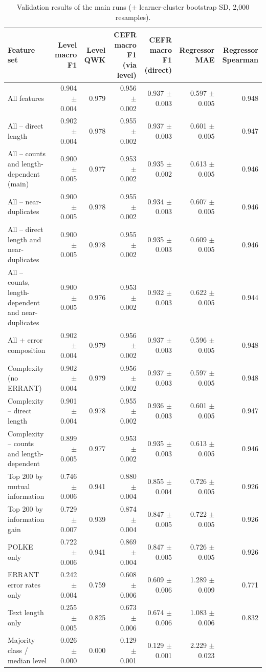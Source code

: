 \begin{table}[t]
\centering
\small
\begin{tabular}{lrrrrrr}
\toprule
Feature set & Level macro F1 & Level QWK & CEFR macro F1 (via level) & CEFR macro F1 (direct) & Regressor MAE & Regressor Spearman \\
\midrule
All features & 0.904 $\pm$ 0.004 & 0.979 & 0.956 $\pm$ 0.002 & 0.937 $\pm$ 0.003 & 0.597 $\pm$ 0.005 & 0.948 \\
All -- direct length & 0.902 $\pm$ 0.004 & 0.978 & 0.955 $\pm$ 0.002 & 0.937 $\pm$ 0.003 & 0.601 $\pm$ 0.005 & 0.947 \\
All -- counts and length-dependent (main) & 0.900 $\pm$ 0.005 & 0.977 & 0.953 $\pm$ 0.002 & 0.935 $\pm$ 0.002 & 0.613 $\pm$ 0.005 & 0.946 \\
All -- near-duplicates & 0.900 $\pm$ 0.005 & 0.978 & 0.955 $\pm$ 0.002 & 0.934 $\pm$ 0.003 & 0.607 $\pm$ 0.005 & 0.946 \\
All -- direct length and near-duplicates & 0.900 $\pm$ 0.005 & 0.978 & 0.955 $\pm$ 0.002 & 0.935 $\pm$ 0.003 & 0.609 $\pm$ 0.005 & 0.946 \\
All -- counts, length-dependent and near-duplicates & 0.900 $\pm$ 0.005 & 0.976 & 0.953 $\pm$ 0.002 & 0.932 $\pm$ 0.003 & 0.622 $\pm$ 0.005 & 0.944 \\
All + error composition & 0.902 $\pm$ 0.004 & 0.979 & 0.956 $\pm$ 0.002 & 0.937 $\pm$ 0.003 & 0.596 $\pm$ 0.005 & 0.948 \\
Complexity (no ERRANT) & 0.902 $\pm$ 0.004 & 0.979 & 0.956 $\pm$ 0.002 & 0.937 $\pm$ 0.003 & 0.597 $\pm$ 0.005 & 0.948 \\
Complexity -- direct length & 0.901 $\pm$ 0.004 & 0.978 & 0.955 $\pm$ 0.002 & 0.936 $\pm$ 0.003 & 0.601 $\pm$ 0.005 & 0.947 \\
Complexity -- counts and length-dependent & 0.899 $\pm$ 0.005 & 0.977 & 0.953 $\pm$ 0.002 & 0.935 $\pm$ 0.003 & 0.613 $\pm$ 0.005 & 0.946 \\
Top 200 by mutual information & 0.746 $\pm$ 0.006 & 0.941 & 0.880 $\pm$ 0.004 & 0.855 $\pm$ 0.004 & 0.726 $\pm$ 0.005 & 0.926 \\
Top 200 by information gain & 0.729 $\pm$ 0.007 & 0.939 & 0.874 $\pm$ 0.004 & 0.847 $\pm$ 0.005 & 0.722 $\pm$ 0.005 & 0.926 \\
POLKE only & 0.722 $\pm$ 0.006 & 0.941 & 0.869 $\pm$ 0.004 & 0.847 $\pm$ 0.005 & 0.726 $\pm$ 0.005 & 0.926 \\
ERRANT error rates only & 0.242 $\pm$ 0.004 & 0.759 & 0.608 $\pm$ 0.006 & 0.609 $\pm$ 0.006 & 1.289 $\pm$ 0.009 & 0.771 \\
Text length only & 0.255 $\pm$ 0.005 & 0.825 & 0.673 $\pm$ 0.006 & 0.674 $\pm$ 0.006 & 1.083 $\pm$ 0.006 & 0.832 \\
Majority class / median level & 0.026 $\pm$ 0.000 & 0.000 & 0.129 $\pm$ 0.001 & 0.129 $\pm$ 0.001 & 2.229 $\pm$ 0.023 &  \\
\bottomrule
\end{tabular}
\caption{Validation results of the main runs ($\pm$ learner-cluster bootstrap SD, 2,000 resamples).}
\label{tab:table_3_validation_results}
\end{table}

